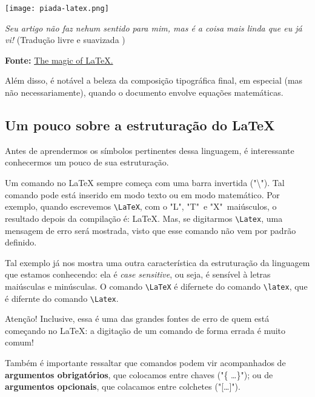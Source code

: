 \begin{marginfigure}
  \texttt{[image: piada-latex.png]}
  
  {
    \sffamily
    \textit{Seu artigo não faz nehum sentido para 
    mim, mas é a coisa mais linda que eu já vi!}
    (Tradução livre e suavizada )
  }
  
  {\textsf{\textbf{Fonte:}} \href{http://nvisnjic.com/2015/01/13/mathjax-magic.html}{The magic of LaTeX.}}
\end{marginfigure}

Além disso, é notável a beleza da composição tipográfica final, em especial (mas
não necessariamente), quando o documento envolve equações matemáticas.

\subsection{Um pouco sobre a estruturação do LaTeX} %

Antes de aprendermos os símbolos pertinentes dessa linguagem, é interessante 
conhecermos um pouco de sua estruturação.

Um comando no \LaTeX{} sempre começa com uma barra invertida ("\textbackslash").
Tal comando pode está inserido em \textsf{modo texto} ou em \textsf{modo matemático}.
Por exemplo, quando escrevemos \verb|\LaTeX|, com o "L", "T"\, e "X"\, maiúsculos, 
o resultado depois da compilação é: \LaTeX.
Mas, se digitarmos \verb|\Latex|, uma mensagem de erro será mostrada, visto que 
esse comando não vem por padrão definido.

Tal exemplo já nos mostra uma outra característica da estruturação da linguagem 
que estamos conhecendo: ela é \textit{case sensitive}, ou seja, é sensível à
letras maiúsculas e minúsculas.
O comando \verb|\LaTeX| é difernete do comando \verb|\latex|, que é difernte do
comando \verb|\Latex|.

\begin{atencao}{Atenção!}{\exclamacao}
  Inclusive, essa é uma das grandes fontes de erro de quem está começando no 
  \LaTeX: a digitação de um comando de forma errada é muito comum!
\end{atencao}

Também é importante ressaltar que comandos podem vir acompanhados de 
\textbf{\textsf{argumentos obrigatórios}}, que colocamos entre \textsf{chaves} 
("\{ \ldots \}"); ou de \textbf{\textsf{argumentos opcionais}}, que colacamos 
entre \textsf{colchetes} ("[\ldots]").

